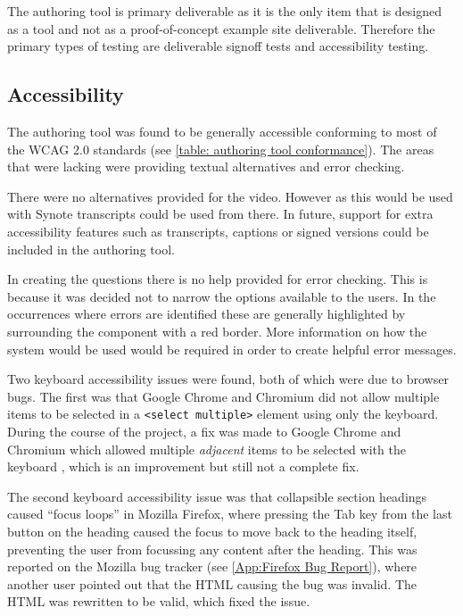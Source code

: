 The authoring tool is primary deliverable as it is the only item that is designed as a tool and not as a proof-of-concept example site deliverable. Therefore the primary types of testing are deliverable signoff tests and accessibility testing.

\subsection{Accessibility}
\label{Section:Testing_Authoring_tool_accessibility}

The authoring tool was found to be generally accessible conforming to most of the \gls{WCAG} 2.0 standards (see \autoref{table: authoring tool conformance}). The areas that were lacking were providing textual alternatives and error checking.

There were no alternatives provided for the video. However as this would be used with Synote transcripts could be used from there. In future, support for extra accessibility features such as transcripts, captions or signed versions could be included in the authoring tool.

In creating the questions there is no help provided for error checking. This is because it was decided not to narrow the options available to the users. In the occurrences where errors are identified these are generally highlighted by surrounding the component with a red border. More information on how the system would be used would be required in order to create helpful error messages.

Two keyboard accessibility issues were found, both of which were due to browser bugs. The first was that Google Chrome and Chromium did not allow multiple items to be selected in a \texttt{\textless select multiple\textgreater} element using only the keyboard. During the course of the project, a fix was made to Google Chrome and Chromium which allowed multiple \textit{adjacent} items to be selected with the keyboard \citep{ChromiumMultipleSelectBug}, which is an improvement but still not a complete fix.

The second keyboard accessibility issue was that collapsible section headings caused ``focus loops'' in Mozilla Firefox, where pressing the Tab key from the last button on the heading caused the focus to move back to the heading itself, preventing the user from focussing any content after the heading. This was reported on the Mozilla bug tracker \citep{FirefoxFocusLoopBug} (see \cref{App:Firefox Bug Report}), where another user pointed out that the HTML causing the bug was invalid. The HTML was rewritten to be valid, which fixed the issue.

